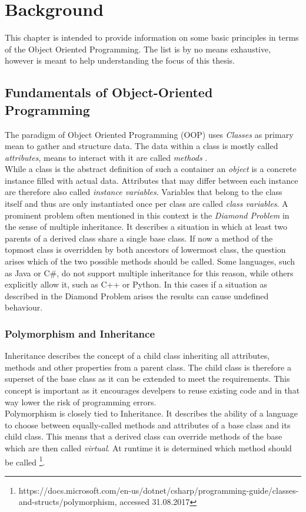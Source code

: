 \chapter{Background}

This chapter is intended to provide information on some basic principles in terms of the Object Oriented Programming. The list is by no means exhaustive, however is meant to help understanding the focus of this thesis.

\section{Fundamentals of Object-Oriented Programming}

The paradigm of Object Oriented Programming (OOP) uses \emph{Classes} as primary mean to gather and structure data. The data within a class is mostly called \emph{attributes}, means to interact with it are called \emph{methods} \citep[80]{Castagna97}. \\
While a class is the abstract definition of such a container an \emph{object} is a concrete instance filled with actual data. Attributes that may differ between each instance are therefore also called \emph{instance variables}. Variables that belong to the class itself and thus are only instantiated once per class are called \emph{class variables}. A prominent problem often mentioned in this context is the \emph{Diamond Problem} in the sense of multiple inheritance. It describes a situation in which at least two parents of a derived class share a single base class. \cite{Truyen04} If now a method of the topmost class is overridden by both ancestors of lowermost class, the question arises which of the two possible methods should be called. Some languages, such as Java or C#, do not support multiple inheritance for this reason, while others explicitly allow it, such as C++ or Python. In this cases if a situation as described in the Diamond Problem arises the results can cause undefined behaviour.

\subsection{Polymorphism and Inheritance}

Inheritance describes the concept of a child class inheriting all attributes, methods and other properties from a parent class. The child class is therefore a superset of the base class as it can be extended to meet the requirements. This concept is important as it encourages develpers to reuse existing code and in that way lower the risk of programming errors. \cite{johnson91}\\
Polymorphism is closely tied to Inheritance. It describes the ability of a language to choose between equally-called methods and attributes of a base class and its child class. This means that a derived class can override methods of the base which are then called \emph{virtual}. At runtime it is determined which method should be called \footnote{https://docs.microsoft.com/en-us/dotnet/csharp/programming-guide/classes-and-structs/polymorphism, accessed 31.08.2017}.

